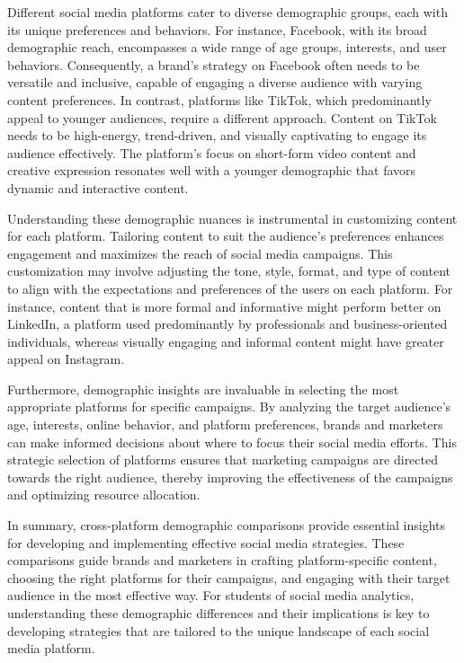 \documentclass[
]{book}
\begin{document}
Different social media platforms cater to diverse demographic groups, each with its unique preferences and behaviors. For instance, Facebook, with its broad demographic reach, encompasses a wide range of age groups, interests, and user behaviors. Consequently, a brand's strategy on Facebook often needs to be versatile and inclusive, capable of engaging a diverse audience with varying content preferences. In contrast, platforms like TikTok, which predominantly appeal to younger audiences, require a different approach. Content on TikTok needs to be high-energy, trend-driven, and visually captivating to engage its audience effectively. The platform's focus on short-form video content and creative expression resonates well with a younger demographic that favors dynamic and interactive content.

Understanding these demographic nuances is instrumental in customizing content for each platform. Tailoring content to suit the audience's preferences enhances engagement and maximizes the reach of social media campaigns. This customization may involve adjusting the tone, style, format, and type of content to align with the expectations and preferences of the users on each platform. For instance, content that is more formal and informative might perform better on LinkedIn, a platform used predominantly by professionals and business-oriented individuals, whereas visually engaging and informal content might have greater appeal on Instagram.

Furthermore, demographic insights are invaluable in selecting the most appropriate platforms for specific campaigns. By analyzing the target audience's age, interests, online behavior, and platform preferences, brands and marketers can make informed decisions about where to focus their social media efforts. This strategic selection of platforms ensures that marketing campaigns are directed towards the right audience, thereby improving the effectiveness of the campaigns and optimizing resource allocation.

In summary, cross-platform demographic comparisons provide essential insights for developing and implementing effective social media strategies. These comparisons guide brands and marketers in crafting platform-specific content, choosing the right platforms for their campaigns, and engaging with their target audience in the most effective way. For students of social media analytics, understanding these demographic differences and their implications is key to developing strategies that are tailored to the unique landscape of each social media platform.
\end{document}
